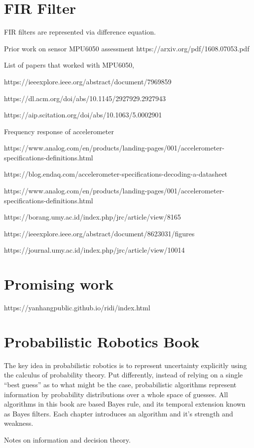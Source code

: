 \documentclass{article}
\begin{document}
\section{FIR Filter}
FIR filters are represented via difference equation.

Prior work on sensor MPU6050 assessment https://arxiv.org/pdf/1608.07053.pdf

List of papers that worked with MPU6050,

https://ieeexplore.ieee.org/abstract/document/7969859

https://dl.acm.org/doi/abs/10.1145/2927929.2927943

https://aip.scitation.org/doi/abs/10.1063/5.0002901

Frequency response of accelerometer

https://www.analog.com/en/products/landing-pages/001/accelerometer-specifications-definitions.html

https://blog.endaq.com/accelerometer-specifications-decoding-a-datasheet

https://www.analog.com/en/products/landing-pages/001/accelerometer-specifications-definitions.html

https://borang.umy.ac.id/index.php/jrc/article/view/8165

https://ieeexplore.ieee.org/abstract/document/8623031/figures

https://journal.umy.ac.id/index.php/jrc/article/view/10014

\section{Promising work}

https://yanhangpublic.github.io/ridi/index.html

\section{Probabilistic Robotics Book}
The key idea in probabilistic robotics is to represent uncertainty explicitly using the calculus of probability theory. Put differently, instead of relying on a single “best guess” as to what might be the case, probabilistic algorithms represent information by probability
distributions over a whole space of guesses. All algorithms in this book are based Bayes rule, and its temporal extension known as Bayes filters. Each chapter introduces an algorithm and it's strength and weakness.

Notes on information and decision theory.
\end{document}
